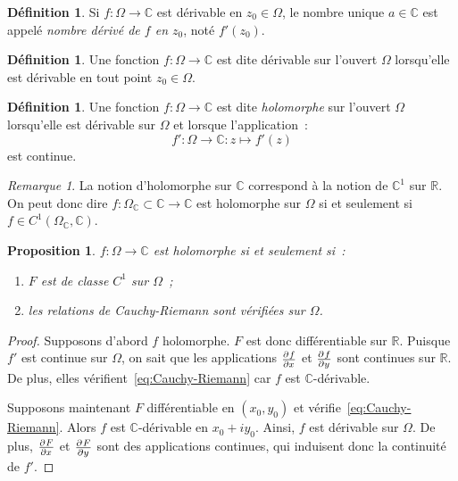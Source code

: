 \documentclass{report}
\newtheorem{prp}[thm]{Proposition}
\theoremstyle{definition}
\newtheorem{déf}[thm]{Définition}
\theoremstyle{remark}
\newtheorem*{rmq}{Remarque}
\numberwithin{equation}{section}
\newcommand{\C}{\mathbb C}
\newcommand{\R}{\mathbb R}
\begin{document}
			\begin{déf} Si $f : \Omega \to \C$ est dérivable en $z_0 \in \Omega$, le nombre unique $a \in \C$ est appelé \textit{nombre dérivé de $f$ en $z_0$}, noté $f'(z_0)$.
			\end{déf}

			\begin{déf} Une fonction $f : \Omega \to \C$ est dite dérivable sur l'ouvert $\Omega$ lorsqu'elle est dérivable en tout point $z_0 \in \Omega$.
			\end{déf}

			\begin{déf} Une fonction $f : \Omega \to \C$ est dite \textit{holomorphe} sur l'ouvert $\Omega$ lorsqu'elle est dérivable sur $\Omega$ et lorsque l'application~:
			\begin{equation}
				f' : \Omega \to \C : z \mapsto f'(z)
			\end{equation}
			est continue.
			\end{déf}

			\begin{rmq} La notion d'holomorphe sur $\C$ correspond à la notion de $\C^1$ sur $\R$. On peut donc dire $f : \Omega_\C \subset \C \to \C$ est
			holomorphe sur $\Omega$ si et seulement si $f \in C^1(\Omega_\C, \C)$.
			\end{rmq}

			\begin{prp} $f : \Omega \to \C$ est holomorphe si et seulement si~:
			\begin{enumerate}
				\item $F$ est de classe $C^1$ sur $\Omega$~;
				\item les relations de Cauchy-Riemann sont vérifiées sur $\Omega$.
			\end{enumerate}
			\end{prp}

			\begin{proof} Supposons d'abord $f$ holomorphe. $F$ est donc différentiable sur $\R$. Puisque $f'$ est continue sur $\Omega$, on sait que les applications
			$\pd fx$ et $\pd fy$ sont continues sur $\R$. De plus, elles vérifient~\eqref{eq:Cauchy-Riemann} car $f$ est $\C$-dérivable.

			Supposons maintenant $F$ différentiable en $(x_0, y_0)$ et vérifie~\eqref{eq:Cauchy-Riemann}. Alors $f$ est $\C$-dérivable en $x_0 + iy_0$. Ainsi, $f$
			est dérivable sur $\Omega$. De plus, $\pd Fx$ et $\pd Fy$ sont des applications continues, qui induisent donc la continuité de $f'$.
			\end{proof}
\end{document}
